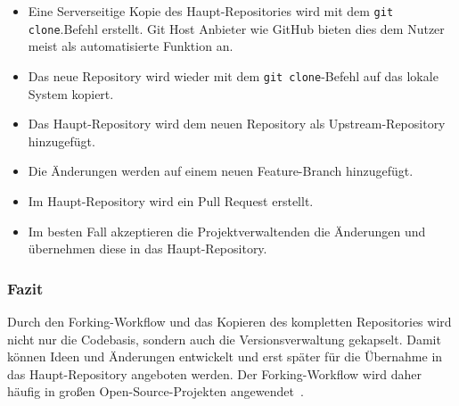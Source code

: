 \begin{itemize}
    \item Eine Serverseitige Kopie des Haupt\hyp Repositories wird mit dem \texttt{git clone}.Befehl erstellt. Git Host Anbieter wie GitHub bieten dies dem Nutzer meist als automatisierte Funktion an.
    
    \item Das neue Repository wird wieder mit dem \texttt{git clone}-Befehl auf das lokale System kopiert.
    
    \item Das Haupt\hyp Repository wird dem neuen Repository als Upstream\hyp Repository hinzugefügt.
    
    \item Die Änderungen werden auf einem neuen Feature\hyp Branch hinzugefügt.
    
    \item Im Haupt\hyp Repository wird ein Pull Request erstellt.
    
    \item Im besten Fall akzeptieren die Projektverwaltenden die Änderungen und übernehmen diese in das Haupt\hyp Repository.
\end{itemize}


\subsubsection{Fazit}

Durch den Forking\hyp Workflow und das Kopieren des kompletten Repositories wird nicht nur die Codebasis, sondern auch die Versionsverwaltung gekapselt. Damit können Ideen und Änderungen entwickelt und erst später für die Übernahme in das Haupt\hyp Repository angeboten werden. Der Forking\hyp Workflow wird daher häufig in großen Open\hyp Source\hyp Projekten angewendet~\cite{github_inc_contributing_2023}.
